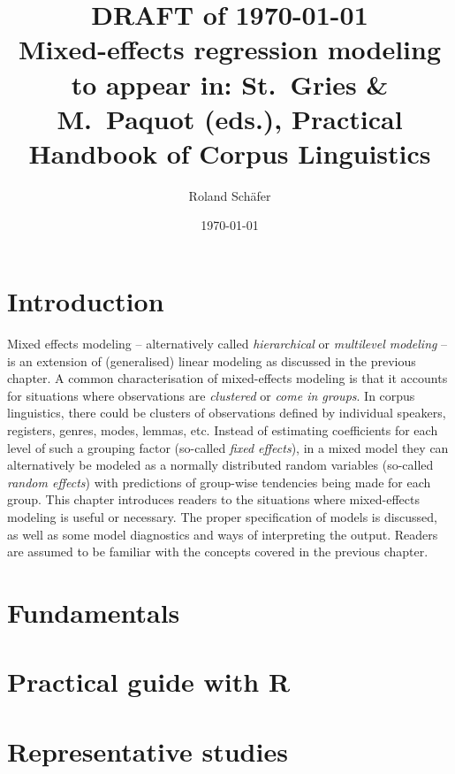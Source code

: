 \documentclass[a4paper,12pt]{article}
\title{{\small DRAFT of \today}\\Mixed-effects regression modeling\\\small to appear in: St.~Gries \& M.~Paquot (eds.), Practical Handbook of Corpus Linguistics}
\author{Roland Schäfer}
\affil{Freie Universität Berlin}
\date{\today}
\begin{document}
       

\maketitle

\section{Introduction}
\label{sec:introduction}

Mixed effects modeling -- alternatively called \textit{hierarchical} or \textit{multilevel modeling} -- is an extension of (generalised) linear modeling as discussed in the previous chapter.
A common characterisation of mixed-effects modeling is that it accounts for situations where observations are \textit{clustered} or \textit{come in groups}.
In corpus linguistics, there could be clusters of observations defined by individual speakers, registers, genres, modes, lemmas, etc.
Instead of estimating coefficients for each level of such a grouping factor (so-called \textit{fixed effects}), in a mixed model they can alternatively be modeled as a normally distributed random variables (so-called \textit{random effects}) with predictions of group-wise tendencies being made for each group.
This chapter introduces readers to the situations where mixed-effects modeling is useful or necessary.
The proper specification of models is discussed, as well as some model diagnostics and ways of interpreting the output.
Readers are assumed to be familiar with the concepts covered in the previous chapter.

\section{Fundamentals}
\label{sec:fundamentals}


\section{Practical guide with R}
\label{sec:practicalguidewithr}



\section{Representative studies}
\end{document}

